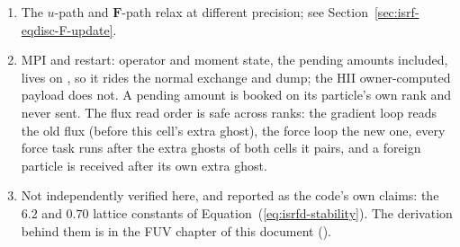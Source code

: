 \begin{enumerate}
    equal depth, and across time bins up to the same-step and
    Hubble terms; see Section~\ref{sec:isrf-eqdisc-pairwise}. The flux
    sum is not conserved: the gradient pair term is symmetric, the flux
    limiter removes flux, and no flux is booked across time bins
    (Section~\ref{sec:fuv-flux-conservation}). The cross-bin
    booking does not preserve positivity, and neither does the per-owner one.
    The metric counts the particle-snapshots whose lowest value at the end of
    an update, since the previous snapshot, is negative, summed over the PE
    and LW bands (debug builds only). On  (level 5, scheme 4, one
    thread), per-owner against cross-bin: 538 / 547 at $Z = 1$ and margin 0.5,
    58 / 64 at $Z = 0$ and margin 0.5, 99 / 101 at $Z = 1$ and margin 0.25,
    and 28 / 26 at $Z = 1$ and margin 0.125. Values negative at the snapshot
    instants, $Z = 1$ and margin 0.5: 54 / 67. On
     (scheme 4, 6 threads), one particle holds
    $-2.07$ at a snapshot against $-0.067$ with the per-owner booking, after its coarse step
    receives a drain larger than its $u$. The mechanism of the excess is not
    established. No limiter is applied, because a limiter would break the
    ledger.
  \item The $u$-path and $\boldsymbol{F}$-path relax at different precision; see
    Section~\ref{sec:isrf-eqdisc-F-update}.
  \item MPI and restart: operator and moment state, the pending amounts
    included, lives on , so it rides the
    normal exchange and dump; the HII owner-computed payload does not. A
    pending amount is booked on its particle's own rank and never sent.
    The flux
    read order is safe across ranks:
    the gradient loop reads the old flux (before this cell's extra ghost), the
    force loop the new one, every force task runs after the extra ghosts of both
    cells it pairs, and a foreign particle is received after its own extra ghost.
  \item Not independently verified here, and reported as the code's own
    claims: the $6.2$ and $0.70$ lattice constants of
    Equation~(\ref{eq:isrfd-stability}). The derivation behind them is in
    the FUV chapter of this document ().
\end{enumerate}

